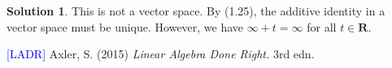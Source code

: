 \documentclass[12pt]{article}
\theoremstyle{definition}
\theoremstyle{exercise}
\theoremstyle{solution}
\newtheorem*{solution}{Solution}
\newcommand{\R}{\mathbf{R}}
\begin{document}
\begin{solution}
    This is not a vector space. By (1.25), the additive identity in a vector space must be unique. However, we have \( \infty + t = \infty \) for all \( t \in \R \).
\end{solution}

\noindent \hrulefill

\noindent \hypertarget{ladr}{\textcolor{blue}{[LADR]} Axler, S. (2015) \textit{Linear Algebra Done Right.} 3rd edn.}
\end{document}
